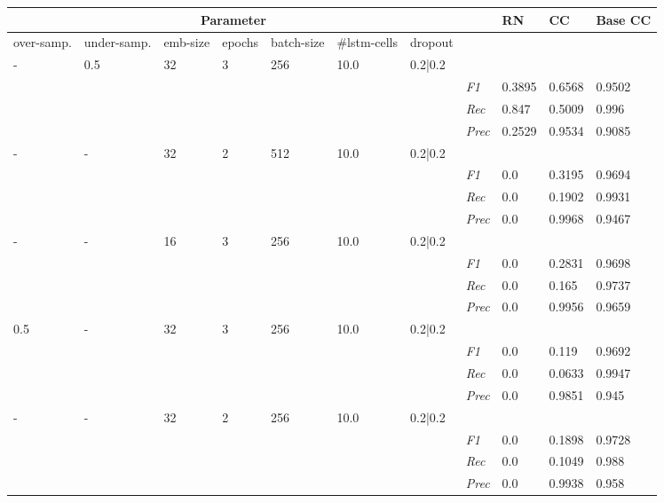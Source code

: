 \begin{table}[]
\tiny
\tabcolsep=0.11cm
\begin{tabularx}{\textwidth}{XXXXXXX|X|X|X|X}
\toprule
\multicolumn{7}{c}{Parameter} & & RN & CC & Base CC \\ \midrule
over-\newline samp. & under-\newline samp. & emb-\newline size & epochs &batch-\newline size & \#lstm-\newline cells & dropout & & & & \\ \midrule
- & 0.5 & 32 & 3 & 256 &10.0 & 0.2|0.2 & & & & \\
& & & & & & & \textit{F1} & 0.3895 & 0.6568 & 0.9502       \\
& & & & & & & \textit{Rec} &  0.847 & 0.5009  & 0.996  \\
& & & & & & & \textit{Prec} & 0.2529 & 0.9534 & 0.9085 \\ \midrule
- & - & 32 & 2 & 512 &10.0 & 0.2|0.2 & & & & \\
& & & & & & & \textit{F1} & 0.0 & 0.3195 & 0.9694       \\
& & & & & & & \textit{Rec} &  0.0 & 0.1902  & 0.9931  \\
& & & & & & & \textit{Prec} & 0.0 & 0.9968 & 0.9467 \\ \midrule
- & - & 16 & 3 & 256 &10.0 & 0.2|0.2 & & & & \\
& & & & & & & \textit{F1} & 0.0 & 0.2831 & 0.9698       \\
& & & & & & & \textit{Rec} &  0.0 & 0.165  & 0.9737  \\
& & & & & & & \textit{Prec} & 0.0 & 0.9956 & 0.9659 \\ \midrule
0.5 & - & 32 & 3 & 256 &10.0 & 0.2|0.2 & & & & \\
& & & & & & & \textit{F1} & 0.0 & 0.119 & 0.9692       \\
& & & & & & & \textit{Rec} &  0.0 & 0.0633  & 0.9947  \\
& & & & & & & \textit{Prec} & 0.0 & 0.9851 & 0.945 \\ \midrule
- & - & 32 & 2 & 256 &10.0 & 0.2|0.2 & & & & \\
& & & & & & & \textit{F1} & 0.0 & 0.1898 & 0.9728       \\
& & & & & & & \textit{Rec} &  0.0 & 0.1049  & 0.988  \\
& & & & & & & \textit{Prec} & 0.0 & 0.9938 & 0.958 \\ \midrule

\end{tabularx}
\end{table}
